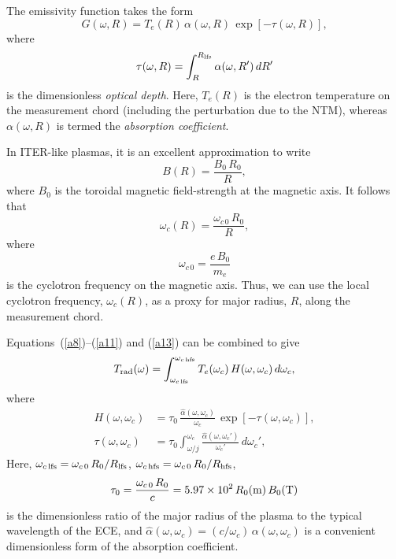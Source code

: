 \documentclass[12pt,prb,aps]{revtex4-1}
\begin{document}
The emissivity function takes the form\,\cite{bornatici}
\begin{equation}\label{a10}
G(\omega, R) = T_e(R)\,\alpha(\omega,R)\,\exp\left[-\tau(\omega,R)\right],
\end{equation}
where 
\begin{equation}\label{a11}
\tau(\omega,R) = \int_R^{R_{\rm lfs}}\alpha(\omega,R')\,dR'
\end{equation}
is the dimensionless {\em optical depth}. 
Here, $T_e(R)$ is the electron temperature on the measurement chord (including the perturbation due to the NTM), whereas $\alpha(\omega,R)$
is termed the {\em absorption coefficient}.

In ITER-like plasmas, it is an excellent approximation to write
\begin{equation}
B(R) = \frac{B_0\,R_0}{R},
\end{equation}
where $B_0$ is the toroidal magnetic field-strength at the magnetic axis.  It follows that
\begin{equation}\label{a13}
\omega_c(R) = \frac{\omega_{c\,0}\,R_0}{R},
\end{equation}
where
\begin{equation}
\omega_{c\,0} = \frac{e\,B_0}{m_e}
\end{equation}
is the cyclotron frequency on the magnetic axis. Thus, we can use the local cyclotron frequency, $\omega_c(R)$, as a proxy for major radius, $R$,  along the measurement chord. 

Equations~(\ref{a8})--(\ref{a11}) and (\ref{a13}) can be combined to give
\begin{equation}\label{a15}
T_{\rm rad}(\omega) = \int_{\omega_{c\,{\rm lfs}}}^{\omega_{c\,{\rm hfs}}}T_e(\omega_c)\,H(\omega,\omega_c)\,d\omega_c,
\end{equation}
where
\begin{align}
H(\omega,\omega_c)&=\tau_0\,\frac{\hat{\alpha}(\omega,\omega_c)}{\omega_c}\,\exp\left[-\tau(\omega,\omega_c)\right],\\[0.5ex]
\tau(\omega,\omega_c)&= \tau_0\int_{\omega/j}^{\omega_c}\frac{\hat{\alpha}(\omega,\omega_c')}{\omega_c'}\,d\omega_c',
\end{align}
Here, $\omega_{c\,{\rm lfs}}= \omega_{c\,0}\,R_0/R_{\rm lfs}$,  $\omega_{c\,{\rm hfs}}= \omega_{c\,0}\,R_0/R_{\rm hfs}$, 
\begin{equation}
\tau_0 = \frac{\omega_{c\,0}\,R_0}{c}= 5.97\times 10^2\,R_0({\rm m})\,B_0({\rm T})
\end{equation}
is the dimensionless  ratio of the major radius of the plasma to the typical wavelength of the ECE, and $\hat{\alpha}(\omega,\omega_c) = (c/\omega_c)\,\alpha(\omega,\omega_c)$
is a convenient dimensionless form of the absorption coefficient. 
\end{document}
